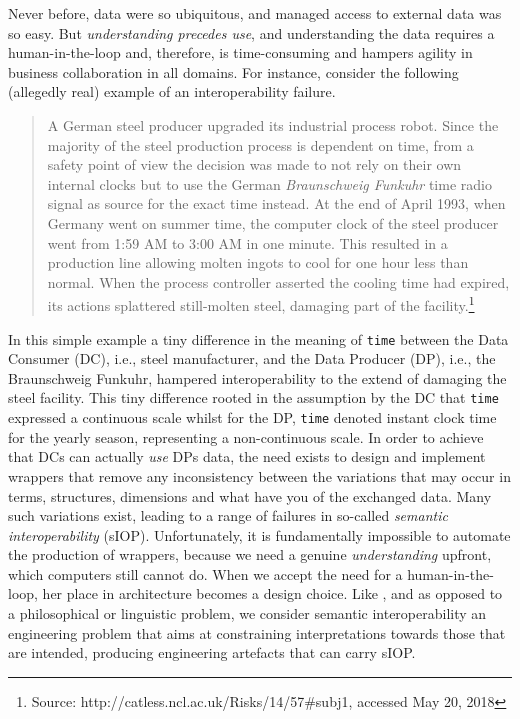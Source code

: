 \documentclass[sort&compress,preprint,authoryear,3p,twocolumn]{elsarticle}
\begin{document}
Never before, data were so ubiquitous, and managed access to external
data was so easy. But \emph{understanding precedes use}, and
understanding the data requires a human-in-the-loop and, therefore, is
time-consuming and hampers agility in business collaboration in all
domains. For instance, consider the following (allegedly real) example
of an interoperability failure.

\begin{quote}
A German steel producer upgraded its industrial process robot. Since the
majority of the steel production process is dependent on time, from a
safety point of view the decision was made to not rely on their own
internal clocks but to use the German \emph{Braunschweig Funkuhr} time
radio signal as source for the exact time instead. At the end of April
1993, when Germany went on summer time, the computer clock of the steel
producer went from 1:59 AM to 3:00 AM in one minute. This resulted in a
production line allowing molten ingots to cool for one hour less than
normal. When the process controller asserted the cooling time had
expired, its actions splattered still-molten steel, damaging part of the
facility.\footnote{Source: http://catless.ncl.ac.uk/Risks/14/57\#subj1,
  accessed May 20, 2018}
\end{quote}

In this simple example a tiny difference in the meaning of \texttt{time}
between the Data Consumer (DC), i.e., steel manufacturer, and the Data
Producer (DP), i.e., the Braunschweig Funkuhr, hampered interoperability
to the extend of damaging the steel facility. This tiny difference
rooted in the assumption by the DC that \texttt{time} expressed a
continuous scale whilst for the DP, \texttt{time} denoted instant clock
time for the yearly season, representing a non-continuous scale. In
order to achieve that DCs can actually \emph{use} DPs data, the need
exists to design and implement wrappers that remove any inconsistency
between the variations that may occur in terms, structures, dimensions
and what have you of the exchanged data. Many such variations exist,
leading to a range of failures in so-called \emph{semantic
interoperability} (sIOP). Unfortunately, it is fundamentally impossible
to automate the production of wrappers, because we need a genuine
\emph{understanding} upfront, which computers still cannot do. When we
accept the need for a human-in-the-loop, her place in architecture
becomes a design choice. Like \citep{Kuhn2009}, and as opposed to a
philosophical or linguistic problem, we consider semantic
interoperability an engineering problem that aims at constraining
interpretations towards those that are intended, producing engineering
artefacts that can carry sIOP.
\end{document}
